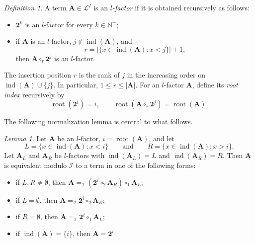 \documentclass[a4paper]{article}
\theoremstyle{plain}
\theoremstyle{definition}
\theoremstyle{remark}
\numberwithin{equation}{section}
\renewcommand{\le}{\leqslant}\renewcommand{\ge}{\geqslant}
\newtheorem{lemma}[theorem]{Lemma}
\newtheorem{definition}[theorem]{Definition}
\begin{document}
\begin{definition}\label{def:l-factor}
A term \(\mathbf A\in\mathcal L^I\) is an \emph{\(l\)-factor} if it is obtained
recursively as follows:
\begin{itemize}
    \item [$\cdot$] \(\mathbf 2^k\) is an \(l\)-factor for every \(k\in\mathbb N^+\);
    \item [$\cdot$] if \(\mathbf A\) is an \(l\)-factor, \(j\notin\operatorname{ind}(\mathbf A)\), and
    \[
    r=\bigl|\{x\in\operatorname{ind}(\mathbf A):x<j\}\bigr|+1,
    \]
    then \(\mathbf A\circ_r \mathbf 2^j\) is an \(l\)-factor.
\end{itemize}
\end{definition}

The insertion position \(r\) is the rank of \(j\) in the increasing order on
\(\operatorname{ind}(\mathbf A)\cup\{j\}\). 
In particular, \(1\le r\le |\mathbf A|\). For an \(l\)-factor
\(\mathbf A\), define its \emph{root index} recursively by
\[
\operatorname{root}(\mathbf 2^i)=i,
\qquad
\operatorname{root}(\mathbf A\circ_r \mathbf 2^j)=\operatorname{root}(\mathbf A).
\]

The following normalization lemma is central to what follows.


\begin{lemma}\label{lem:normalization}
Let \(\mathbf A\) be an \(l\)-factor, $i=\operatorname{root}(\mathbf A)$, and let
\[
L=\{x\in\operatorname{ind}(\mathbf A):x<i\}
\qquad
\text{and}
\qquad
R=\{x\in\operatorname{ind}(\mathbf A):x>i\}.
\]
Let \(\mathbf A_L\) and \(\mathbf A_R\) be $l$-factors with $\operatorname{ind}(\mathbf A_L)=L$ and $\operatorname{ind}(\mathbf A_R)=R$.
Then $\mathbf{A}$ is equivalent modulo ${\mathcal I}$ to a term in one of the following forms:
\begin{itemize}
    \item [$\cdot$] if $L,R\neq\emptyset$, then $\mathbf A =_{\mathcal I} (\mathbf 2^{i}\circ_2 \mathbf A_R)\circ_1 \mathbf A_L$;
    \item [$\cdot$] if $L=\emptyset$, then $\mathbf A =_{\mathcal I} \mathbf 2^{i}\circ_2 \mathbf A_R$;
    \item [$\cdot$] if $R=\emptyset$, then $\mathbf A =_{\mathcal I} \mathbf 2^{i}\circ_1 \mathbf A_L$;
    \item [$\cdot$] if $\operatorname{ind}(\mathbf A)=\{i\}$, then \(\mathbf A=\mathbf 2^{i}\).
\end{itemize}
\end{lemma}
\end{document}
